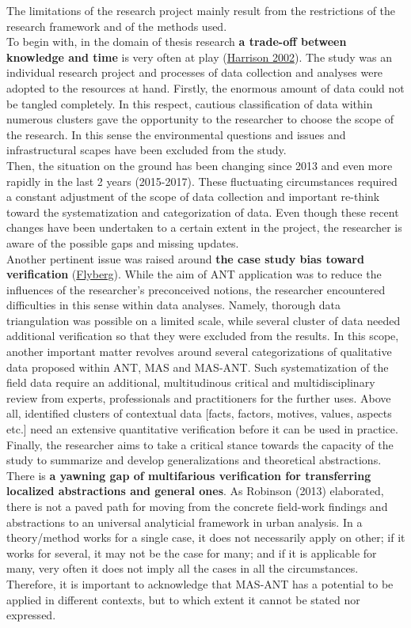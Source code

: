 \documentclass[11pt]{report}
\begin{document}
{The limitations of the research project mainly result from the restrictions of the research framework and of the methods used.
\\
To begin with, in the domain of thesis research \textbf{a trade-off between knowledge and time} is very often at play (\href{}{Harrison 2002}).
The study was an individual research project and processes of data collection and analyses were adopted to the resources at hand.
Firstly, the enormous amount of data could not be tangled completely. In this respect, cautious classification of data within numerous clusters gave the opportunity to the researcher to choose the scope of the research.
In this sense the environmental questions and issues and infrastructural scapes have been excluded from the study.
\\
Then, the situation on the ground has been changing since 2013 and even more rapidly in the last 2 years (2015-2017).
These fluctuating circumstances required a constant adjustment of the scope of data collection and important re-think toward the systematization and categorization of data.
Even though these recent changes have been undertaken to a certain extent in the project, the researcher is aware of the possible gaps and missing updates.
\\
Another pertinent issue was raised around \textbf{the case study bias toward verification} (\href{}{Flyberg}).
While the aim of ANT application was to reduce the influences of the researcher's preconceived notions, the researcher encountered difficulties in this sense within data analyses.
Namely, thorough data triangulation was possible on a limited scale, while several cluster of data needed additional verification so that they were excluded from the results.
In this scope, another important matter revolves around several categorizations of qualitative data proposed within ANT, MAS and MAS-ANT. 
Such systematization of the field data require an additional, multitudinous critical and multidisciplinary review from experts, professionals and practitioners for the further uses.
Above all, identified clusters of contextual data [facts, factors, motives, values, aspects etc.] need an extensive quantitative verification before it can be used in practice.
\\
Finally, the researcher aims to take a critical stance towards the capacity of the study to summarize and develop generalizations and theoretical abstractions.
There is \textbf{a yawning gap of multifarious verification for transferring localized abstractions and general ones}.
As Robinson (2013) elaborated, there is not a paved path for moving from the concrete field-work findings and abstractions to an universal analyticial framework in urban analysis. In a theory/method works for a single case, it does not necessarily apply on other; if it works for several, it may not be the case for many; and if it is applicable for many, very often it does not imply all the cases in all the circumstances.
Therefore, it is important to acknowledge that MAS-ANT has a potential to be applied in different contexts, but to which extent it cannot be stated nor expressed.


}
\end{document}
